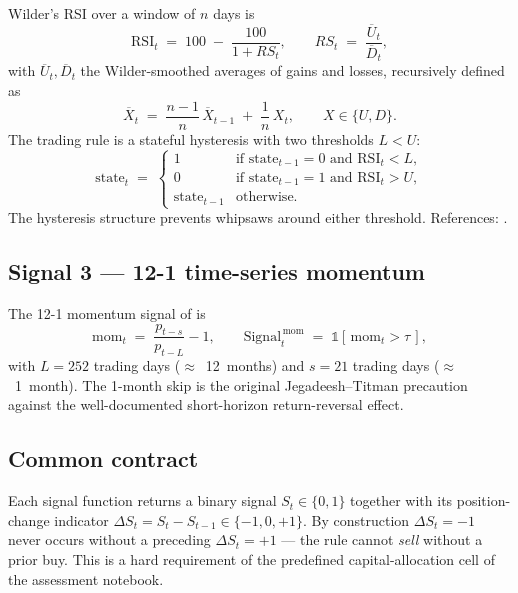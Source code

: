 \documentclass[11pt,a4paper]{article}
\begin{document}
Wilder's RSI over a window of $n$ days is
\begin{equation}
\mathrm{RSI}_{t} \;=\; 100 \;-\; \frac{100}{1 + RS_t}, \qquad
RS_t \;=\; \frac{\overline{U}_t}{\overline{D}_t},
\label{eq:rsi}
\end{equation}
with $\overline{U}_t,\overline{D}_t$ the Wilder-smoothed averages of gains
and losses, recursively defined as
\begin{equation}
\overline{X}_{t} \;=\; \frac{n - 1}{n}\,\overline{X}_{t-1} \;+\; \frac{1}{n}\,X_t,
\qquad X \in \{U, D\}.
\end{equation}
The trading rule is a stateful hysteresis with two thresholds $L < U$:
\begin{equation}
\mathrm{state}_{t} \;=\;
\begin{cases}
1 & \text{if } \mathrm{state}_{t-1} = 0 \text{ and } \mathrm{RSI}_t < L,\\
0 & \text{if } \mathrm{state}_{t-1} = 1 \text{ and } \mathrm{RSI}_t > U,\\
\mathrm{state}_{t-1} & \text{otherwise.}
\end{cases}
\end{equation}
The hysteresis structure prevents whipsaws around either threshold.
References: \citet{Wilder1978,Chong2008}.

\subsection{Signal 3 --- 12-1 time-series momentum}

The 12-1 momentum signal of \citet{Jegadeesh1993,Moskowitz2012} is
\begin{equation}
\mathrm{mom}_{t} \;=\; \frac{p_{t-s}}{p_{t-L}} - 1, \qquad
\mathrm{Signal}^{\,\mathrm{mom}}_{t} \;=\; \mathbb{1}\!\left[\,\mathrm{mom}_{t} > \tau \,\right],
\label{eq:mom}
\end{equation}
with $L = 252$ trading days ($\approx$~12~months) and $s = 21$ trading days
($\approx$~1~month). The 1-month skip is the original Jegadeesh--Titman
precaution against the well-documented short-horizon return-reversal effect.

\subsection{Common contract}

Each signal function returns a binary signal $S_t \in \{0,1\}$ together with
its position-change indicator $\Delta S_t = S_t - S_{t-1} \in \{-1, 0, +1\}$.
By construction $\Delta S_t = -1$ never occurs without a preceding
$\Delta S_t = +1$ --- the rule cannot \emph{sell} without a prior buy. This is
a hard requirement of the predefined capital-allocation cell of the
assessment notebook.
\end{document}
